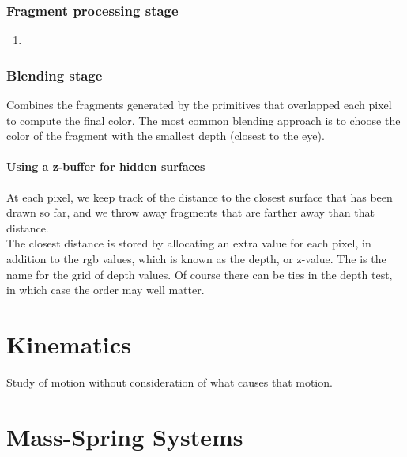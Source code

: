 \documentclass[11pt]{article}
\numberwithin{equation}{section}
\begin{document}
\subsubsection{Fragment processing stage}
\begin{enumerate}
	\item 
\end{enumerate}
\subsubsection{Blending stage}
Combines the fragments generated by the primitives that overlapped each pixel to compute the final color. The most common blending approach is to choose the color of the fragment with the smallest depth (closest to the eye).
 
\paragraph{Using a z-buffer for hidden surfaces}
At each pixel, we keep track of the distance to the closest surface that has been drawn so far, and we throw away fragments that are farther away than that distance.\\
The closest distance is stored by allocating an extra value for each pixel, in addition to the rgb values, which is known as the depth, or z-value. The  is the name for the grid of depth values.
\remark
Of course there can be ties in the depth test, in which case the order may well matter.

\section{Kinematics}
Study of motion without consideration of what causes that motion.
\section{Mass-Spring Systems}
\end{document}
